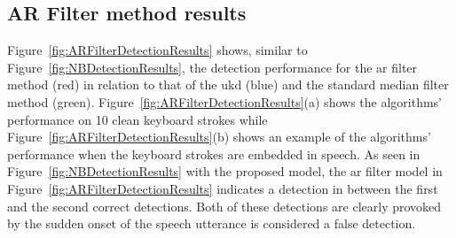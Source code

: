 \DIFaddend \subsection{AR Filter method results}
Figure~\ref{fig:ARFilterDetectionResults} shows, similar to Figure~\ref{fig:NBDetectionResults}, the detection performance for the \DIFdelbegin {}\DIFdelend \DIFaddbegin \gls{ar} \DIFaddend filter method (red) in relation to that of the \DIFdelbegin {}\DIFdelend \DIFaddbegin \gls{ukd}\DIFaddend \cite{Subramanya2007} (blue) and the standard median filter method (green). Figure~\ref{fig:ARFilterDetectionResults}(a) shows the algorithms' performance on 10 clean keyboard strokes while Figure~\ref{fig:ARFilterDetectionResults}(b) shows an example of the algorithms' performance when the keyboard strokes are embedded in speech. As seen in Figure~\ref{fig:NBDetectionResults} with the proposed \DIFdelbegin {}\DIFdelend \DIFaddbegin {}\DIFaddend model, the \DIFdelbegin {}\DIFdelend \DIFaddbegin \gls{ar} \DIFaddend filter model in Figure~\ref{fig:ARFilterDetectionResults} indicates a detection in between the first and the second correct detections. Both of these detections are clearly provoked by the sudden onset of the speech utterance \DIFdelbegin {}\DIFdelend \DIFaddbegin {}\DIFaddend is considered a false detection.


